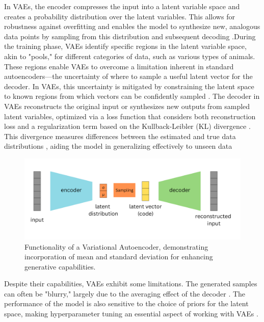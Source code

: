 In VAEs, the encoder compresses the input into a latent variable space and creates a probability distribution over the latent variables. This allows for robustness against overfitting and enables the model to synthesize new, analogous data points by sampling from this distribution and subsequent decoding \citep{kingmaVAE, rezendeVAE}.During the training phase, VAEs identify specific regions in the latent variable space, akin to "pools," for different categories of data, such as various types of animals. These regions enable VAEs to overcome a limitation inherent in standard autoencoders—the uncertainty of where to sample a useful latent vector for the decoder. In VAEs, this uncertainty is mitigated by constraining the latent space to known regions from which vectors can be confidently sampled \citep{doerschVAE}. The decoder in VAEs reconstructs the original input or synthesizes new outputs from sampled latent variables, optimized via a loss function that considers both reconstruction loss and a regularization term based on the Kullback-Leibler (KL) divergence \citep{GoodfellowDeepLearning}. This divergence measures differences between the estimated and true data distributions \citep{kingmaVAE}, aiding the model in generalizing effectively to unseen data


\begin{figure}[ht]
    \centering
      \hspace{.9cm}
      \includegraphics[width=.8\columnwidth]{figures/VAE.png}
      \caption{Functionality of a Variational Autoencoder, demonstrating incorporation of mean and standard deviation for enhancing generative capabilities.}
      \label{fig:figureVAE}
\end{figure}

Despite their capabilities, VAEs exhibit some limitations. The generated samples can often be "blurry," largely due to the averaging effect of the decoder \citep{zhaoVAE}. The performance of the model is also sensitive to the choice of priors for the latent space, making hyperparameter tuning an essential aspect of working with VAEs \citep{kingmaVAE, higginsVAE}. 